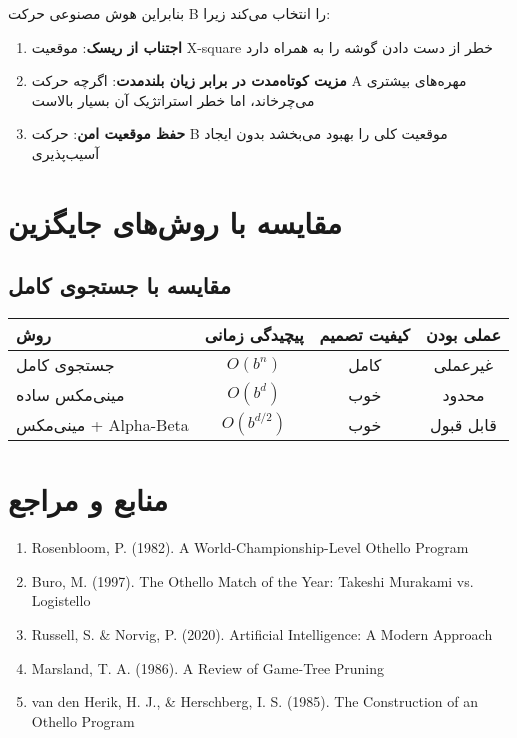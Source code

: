 \documentclass[12pt]{article}
\begin{document}
	بنابراین هوش مصنوعی حرکت B را انتخاب می‌کند زیرا:
	
	\begin{enumerate}
		\item \textbf{اجتناب از ریسک}: موقعیت X-square خطر از دست دادن گوشه را به همراه دارد
		\item \textbf{مزیت کوتاه‌مدت در برابر زیان بلندمدت}: اگرچه حرکت A مهره‌های بیشتری می‌چرخاند، اما خطر استراتژیک آن بسیار بالاست
		\item \textbf{حفظ موقعیت امن}: حرکت B موقعیت کلی را بهبود می‌بخشد بدون ایجاد آسیب‌پذیری
	\end{enumerate}
	
	\section{مقایسه با روش‌های جایگزین}
	
	\subsection{مقایسه با جستجوی کامل}
	
	\begin{center}
		\begin{tabular}{|l|c|c|c|}
			\hline
			\textbf{روش} & \textbf{پیچیدگی زمانی} & \textbf{کیفیت تصمیم} & \textbf{عملی بودن} \\
			\hline
			جستجوی کامل & $O(b^n)$ & کامل & غیرعملی \\
			\hline
			مینی‌مکس ساده & $O(b^d)$ & خوب & محدود \\
			\hline
			مینی‌مکس + Alpha-Beta & $O(b^{d/2})$ & خوب & قابل قبول \\
			\hline
		\end{tabular}
	\end{center}
	
	\section{منابع و مراجع}
	
	\begin{enumerate}
		\item Rosenbloom, P. (1982). A World-Championship-Level Othello Program
		\item Buro, M. (1997). The Othello Match of the Year: Takeshi Murakami vs. Logistello  
		\item Russell, S. & Norvig, P. (2020). Artificial Intelligence: A Modern Approach
		\item Marsland, T. A. (1986). A Review of Game-Tree Pruning
		\item van den Herik, H. J., & Herschberg, I. S. (1985). The Construction of an Othello Program
	\end{enumerate}
	
\end{document}
